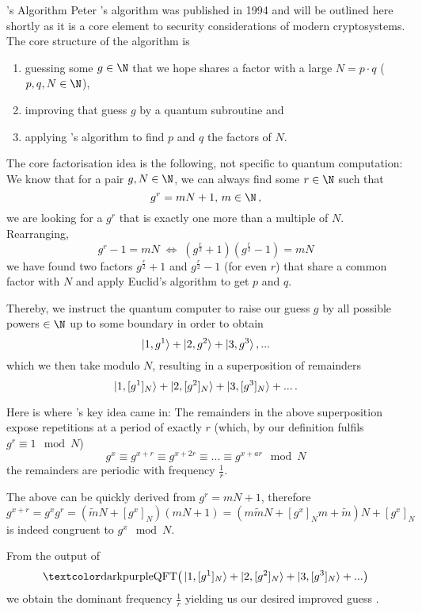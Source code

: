 \begin{frame}[allowframebreaks]{'s Algorithm}
  Peter 's algorithm was published in 1994 \parencite{1997-shors-algorithm} and will be outlined here shortly as it is a core element to security considerations of modern cryptosystems.
  The core structure of the algorithm is
  \begin{enumerate}
    \item guessing some $g \in \N$ that we hope shares a factor with a large $N = p \cdot q$ ($p, q, N \in \N$),
    \item improving that guess $g$ by a quantum subroutine and
    \item applying 's algorithm to find $p$ and $q$ the factors of $N$.
  \end{enumerate}

  The core factorisation idea is the following, not specific to quantum computation: We know that for a pair $g, N \in \N$, we can always find some $r \in \N$ such that
  $$g^r = m N + 1,\, m \in \N\,,$$
  we are looking for a $g^r$ that is exactly one more than a multiple of $N$.
  Rearranging,
  $$g^r - 1 = m N \;\Longleftrightarrow\; (g^\frac{r}{2} + 1)(g^\frac{r}{2} - 1) = m N$$
  we have found two factors $g^\frac{r}{2} + 1$ and $g^\frac{r}{2} - 1$ (for even $r$) that share a common factor with $N$ and apply Euclid's algorithm to get $p$ and $q$.

  Thereby, we instruct the quantum computer to raise our guess $g$ by all possible powers $\in \N$ up to some boundary in order to obtain
  $$\ket{1, g^1} + \ket{2, g^2} + \ket{3, g^3}, ...$$
  which we then take modulo $N$, resulting in a superposition of remainders
  $$\ket{1, [g^1]_N} + \ket{2, [g^2]_N} + \ket{3, [g^3]_N} + ... \,.$$

  Here is where 's key idea came in:
  The remainders in the above superposition expose repetitions at a period of exactly $r$ (which, by our definition fulfils $g^r \equiv 1 \mod N$)
  $$g^x \equiv g^{x + r} \equiv g^{x + 2r} \equiv ... \equiv g^{x + ar} \mod N$$
  the remainders are periodic with frequency $\frac{1}{r}$.

  The above can be quickly derived from $g^r = mN + 1$, therefore $$g^{x+r} = g^x g^r = (\tilde{m} N + [g^x]_N) (m N + 1) = (m \tilde{m} N + [g^x]_N m + \tilde{m}) N + [g^x]_N$$ is indeed congruent to $g^x \mod N$.

  From the output of
  $$\cryptop{QFT}\big(\ket{1, [g^1]_N} + \ket{2, [g^2]_N} + \ket{3, [g^3]_N} + ...\big)$$
  we obtain the dominant frequency $\frac{1}{r}$ yielding us our desired improved guess \parencite{1997-shors-algorithm}.
\end{frame}
